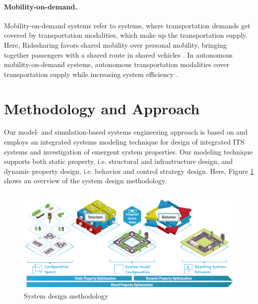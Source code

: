 \documentclass[a4paper,twoside]{article}
\begin{document}
	\paragraph{Mobility-on-demand.}
\label{sec:mobility-on-demand-systems}
	Mobility-on-demand systems refer to systems, where transportation demands get covered by transportation modalities, which make up the transportation supply.
	Here, Ridesharing favors shared mobility over personal mobility, bringing together passengers with a shared route in shared vehicles \cite{furuhata2013ridesharing}.
	 In autonomous mobility-on-demand systems, autonomous transportation modalities cover transportation supply while increasing system efficiency \cite{fagnant2014travel}. 
	
	\section{Methodology and Approach}
	\label{sec:approach}
	
	Our model- and simulation-based systems engineering approach is based on \cite{ascher_hackenberg_2015,ascher_hackenberg_2016,ascher_hackenberg_2017,ascher_hackenberg_albayrak_2023,ascher2023discrete}
	and employs an integrated systems modeling technique for design of integrated ITS systems and investigation of emergent system properties. Our modeling technique supports both static property, i.e. structural and infrastructure design, and dynamic property design, i.e. behavior and control strategy design. Here, Figure \ref{fig:concept} shows an overview of the system design methodology.
	
	\begin{figure}[!ht]
		\centering
		\includegraphics[width=0.95\columnwidth]{property_optimization.png}
		\caption{System design methodology}
		\label{fig:concept}
	\end{figure}
	
\end{document}
